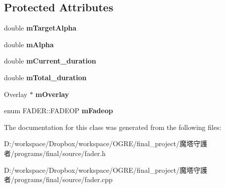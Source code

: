 \subsection*{Protected Attributes}
\begin{DoxyCompactItemize}
\item 
\hypertarget{class_f_a_d_e_r_a858c12e46b29311d910f6ae309a2d837}{
double {\bfseries mTargetAlpha}}
\label{class_f_a_d_e_r_a858c12e46b29311d910f6ae309a2d837}

\item 
\hypertarget{class_f_a_d_e_r_a254005d8dfe5b1f8831cbd90c29eb40f}{
double {\bfseries mAlpha}}
\label{class_f_a_d_e_r_a254005d8dfe5b1f8831cbd90c29eb40f}

\item 
\hypertarget{class_f_a_d_e_r_a907123bc15a80673fdcc1770524d8cc6}{
double {\bfseries mCurrent\_\-duration}}
\label{class_f_a_d_e_r_a907123bc15a80673fdcc1770524d8cc6}

\item 
\hypertarget{class_f_a_d_e_r_a5c5a57c56fad353cf1ccaa52ef3a5d75}{
double {\bfseries mTotal\_\-duration}}
\label{class_f_a_d_e_r_a5c5a57c56fad353cf1ccaa52ef3a5d75}

\item 
\hypertarget{class_f_a_d_e_r_aafe153a2c098939f5297e3c09834252f}{
Overlay $\ast$ {\bfseries mOverlay}}
\label{class_f_a_d_e_r_aafe153a2c098939f5297e3c09834252f}

\item 
\hypertarget{class_f_a_d_e_r_a3f2ad19658b53d00e315a75c912bbb65}{
enum FADER::FADEOP {\bfseries mFadeop}}
\label{class_f_a_d_e_r_a3f2ad19658b53d00e315a75c912bbb65}

\end{DoxyCompactItemize}


The documentation for this class was generated from the following files:\begin{DoxyCompactItemize}
\item 
D:/workspace/Dropbox/workspace/OGRE/final\_\-project/魔塔守護者/programs/final/source/fader.h\item 
D:/workspace/Dropbox/workspace/OGRE/final\_\-project/魔塔守護者/programs/final/source/fader.cpp\end{DoxyCompactItemize}
